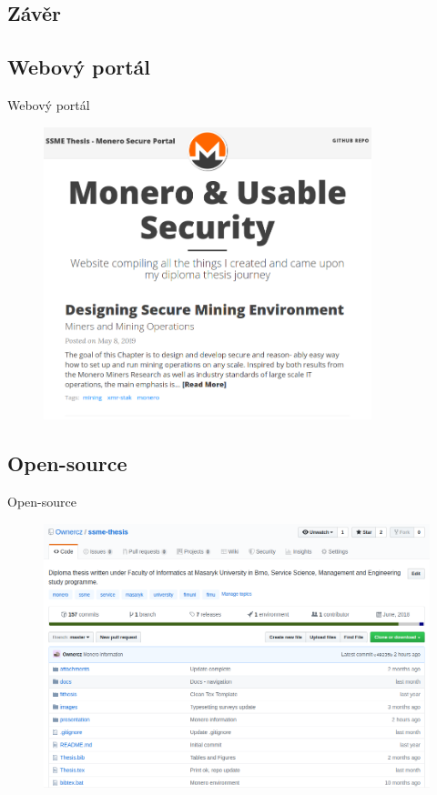 \documentclass{beamer}
\begin{document}
  \begin{darkframes}
    \section{Závěr}
    \subsection{Webový portál}
    \begin{frame}{Webový portál}
      	\begin{figure}
  \centering
  \includegraphics[trim={0 1cm 0 0},clip,width=0.85\textwidth]{ssme-portal.png}
\end{figure}
    \end{frame}
    \subsection{Open-source}
    \begin{frame}{Open-source}
     	\begin{figure}
  \centering
  \includegraphics[width=1\textwidth]{github-repo.png}
\end{figure}
    \end{frame}
  \end{darkframes}
  
\end{document}
